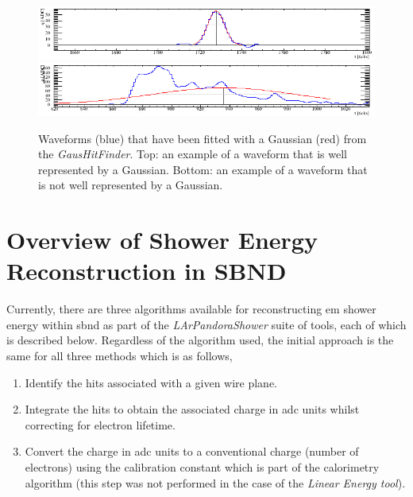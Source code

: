 \begin{figure}[h!]
    \centering
    \includegraphics[width = \hugefigwidth]{figures-chap4/good_gauss_fit.png}
    \includegraphics[width = \hugefigwidth]{figures-chap4/bad_gauss_fit.png}
    \caption[Example of a well and poorly fitted waveform.]{Waveforms (blue) that have been fitted with a Gaussian (red) from the \textit{GausHitFinder}. Top: an example of a waveform that is well represented by a Gaussian. Bottom: an example of a waveform that is not well represented by a Gaussian.}
    \label{fig:fitted_waveforms}
\end{figure}

\section{Overview of Shower Energy Reconstruction in SBND}\label{subchap:shower reco overview}

Currently, there are three algorithms available for reconstructing \gls{em} shower energy within \gls{sbnd} as part of the \textit{LArPandoraShower} suite of tools, each of which is described below. Regardless of the algorithm used, the initial approach is the same for all three methods which is as follows,
\begin{enumerate}
    \item Identify the hits associated with a given wire plane.
    \item Integrate the hits to obtain the associated charge in \gls{adc} units whilst correcting for electron lifetime. 
    \item Convert the charge in \gls{adc} units to a conventional charge (number of electrons) using the calibration constant which is part of the calorimetry algorithm (this step was not performed in the case of the \textit{Linear Energy tool}). 
\end{enumerate}

